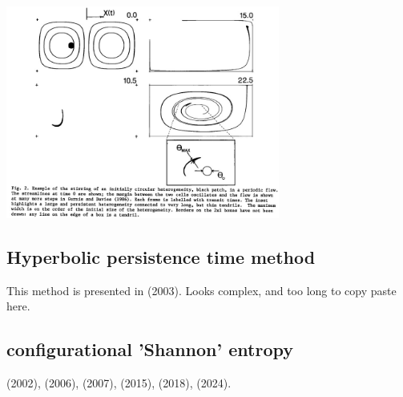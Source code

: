\begin{center}
\includegraphics[width=9cm]{images/mixing/gurn86}
\end{center}

\subsection{Hyperbolic persistence time method}

This method is presented in \textcite{fasa03} (2003).
Looks complex, and too long to copy paste here.



\subsection{configurational 'Shannon' entropy}

\textcite{gobo02} (2002), 
\textcite{cakm06} (2006),
\textcite{nake07} (2007), 
\textcite{pedp15} (2015),
\textcite{bipe18} (2018),
\textcite{vatv24} (2024).



